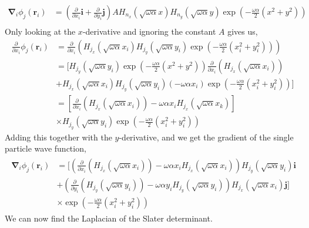 \documentclass[11pt]{article}
\begin{document}
\begin{align*}
	\bm{\nabla}_i \phi_j(\mathbf{r}_i) &= \left( \frac{\partial}{\partial x_i} \mathbf{i} + \frac{\partial}{\partial y_i} \mathbf{j} \right) AH_{n_x} (\sqrt{\omega\alpha}x) H_{n_y} (\sqrt{\omega\alpha} y) \exp{\left(-\frac{\omega\alpha}{2}\left( x^2 + y^2 \right)\right)} \\
\end{align*}
Only looking at the $x$-derivative and ignoring the constant $A$ gives us,
\begin{align*}
	\frac{\partial}{\partial x_i} \phi_j(\mathbf{r}_i) &= \frac{\partial}{\partial x_i} \left(H_{j_x} (\sqrt{\omega\alpha}x_i) H_{j_y} (\sqrt{\omega\alpha} y_i) \exp{\left(-\frac{\omega\alpha}{2}\left( x_i^2 + y_i^2 \right)\right)} \right) \\
	&= \bigg[ H_{j_y} (\sqrt{\omega\alpha} y_i) \exp{\left(-\frac{\omega\alpha}{2}\left( x^2 + y^2 \right)\right)}\frac{\partial}{\partial x_i}\left( H_{j_x} (\sqrt{\omega\alpha}x_i) \right) \\
	&+ H_{j_x} (\sqrt{\omega\alpha}x_i) H_{j_y} (\sqrt{\omega\alpha} y_i) (-\omega\alpha x_i) \exp{\left(-\frac{\omega\alpha}{2}\left( x_i^2 + y_i^2 \right)\right)} \bigg] \\
	&= \left[ \frac{\partial}{\partial x_i}\left( H_{j_x} (\sqrt{\omega\alpha}x_i) \right) - \omega\alpha x_i H_{j_x} (\sqrt{\omega\alpha}x_k) \right] \\
	&\times H_{j_y} (\sqrt{\omega\alpha} y_i)\exp{\left(-\frac{\omega\alpha}{2}\left( x_i^2 + y_i^2 \right)\right)}
\end{align*}
Adding this together with the $y$-derivative, and we get the gradient of the single particle wave function,
\begin{align}
	\begin{split}
		\bm{\nabla}_i \phi_j (\mathbf{r}_i) &= \bigg[ \left( \frac{\partial}{\partial x_i}\left( H_{j_x} (\sqrt{\omega\alpha}x_i) \right) - \omega\alpha x_i H_{j_x} (\sqrt{\omega\alpha}x_i) \right) H_{j_y} (\sqrt{\omega\alpha} y_i) \mathbf{i} \\
		&+ \left( \frac{\partial}{\partial y_i}\left( H_{j_y} (\sqrt{\omega\alpha}y_i) \right) - \omega\alpha y_i H_{j_y} (\sqrt{\omega\alpha}y_i) \right) H_{j_x} (\sqrt{\omega\alpha} x_i) \mathbf{j}	\bigg] \\
		& \times \exp{\left(-\frac{\omega\alpha}{2}\left( x_i^2 + y_i^2 \right)\right)}
	\end{split}
	\label{eq:wf-sp-gradient}
\end{align}
We can now find the Laplacian of the Slater determinant. 
\end{document}
